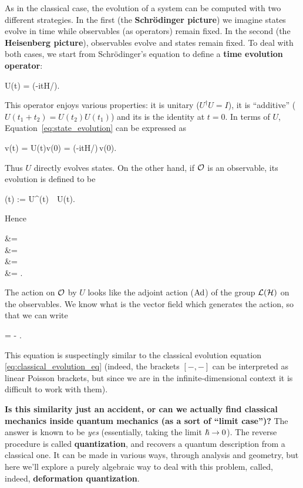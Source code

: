 As in the classical case, the evolution of a system can be computed with two different strategies. In the first (the \textbf{Schr\"odinger picture}) we imagine states evolve in time while observables (as operators) remain fixed. In the second (the \textbf{Heisenberg picture}), observables evolve and states remain fixed. To deal with both cases, we start from Schr\"odinger's equation to define a \textbf{time evolution operator}:
\begin{eqalign}
	U(t) = \exp(-itH/\planck).
\end{eqalign}
This operator enjoys various properties: it is unitary ($U^\dagger U = I$), it is ``additive'' ($U(t_1+t_2)=U(t_2)U(t_1)$) and its is the identity at $t=0$. In terms of $U$, Equation~\eqref{eq:state_evolution} can be expressed as
\begin{eqalign}
	v(t) = U(t)v(0) = \exp(-itH/\planck)\,v(0).
\end{eqalign}
Thus $U$ directly evolves states. On the other hand, if $\mathcal{O}$ is an observable, its evolution is defined to be
\begin{eqalign}
	\obs(t) := U^\dagger(t)\, \obs\, U(t).
\end{eqalign}
Hence
\begin{eqalign}
	 &= \\
	&= \\
	&= \\
	&= .
\end{eqalign}
The action on $\mathcal{O}$ by $U$ looks like the adjoint action ($\operatorname{Ad}$) of the group $\mathcal{L}(\mathcal{H})$ on the observables. We know what is the vector field which generates the action, so that we can write
\begin{eqalign}
\label{eq:qm_evolution}
	 = - \planck [\obs(t), H].
\end{eqalign}
This equation is suspectingly similar to the classical evolution equation \eqref{eq:classical_evolution_eq} (indeed, the brackets $[-,-]$ can be interpreted as linear Poisson brackets, but since we are in the infinite-dimensional context it is difficult to work with them).

\textbf{Is this similarity just an accident, or can we actually find classical mechanics inside quantum mechanics (as a sort of ``limit case'')?} The answer is known to be \emph{yes} (essentially, taking the limit ${\boldsymbol\hslash} \to 0$). The reverse procedure is called \textbf{quantization}, and recovers a quantum description from a classical one. It can be made in various ways, through analysis and geometry, but here we'll explore a purely algebraic way to deal with this problem, called, indeed, \textbf{deformation quantization}.

